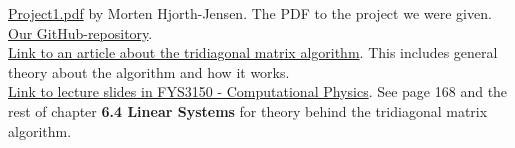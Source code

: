 \documentclass{article}
\begin{document}
\href{https://github.com/CompPhysics/ComputationalPhysics/blob/master/doc/Projects/2019/Project1/pdf/Project1.pdf}{Project1.pdf} by Morten Hjorth-Jensen. The PDF to the project we were given.\\

\href{https://github.com/Erikbgram/Fys3150}{Our GitHub-repository}. \\

\href{http://www.industrial-maths.com/ms6021_thomas.pdf}{Link to an article about the tridiagonal matrix algorithm}. This includes general theory about the algorithm and how it works. \\

\href{https://github.com/CompPhysics/ComputationalPhysics/blob/master/doc/Lectures/lectures2015.pdf}{Link to lecture slides in FYS3150 - Computational Physics}. See page 168 and the rest of chapter \textbf{6.4 Linear Systems} for theory behind the tridiagonal matrix algorithm.






\end{document}
